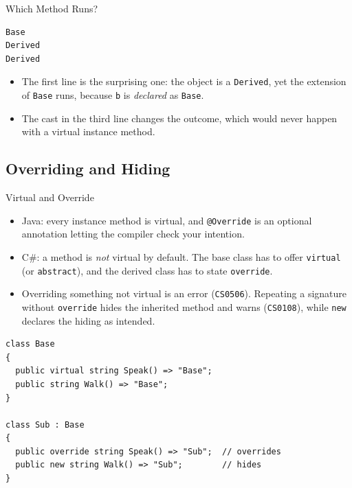 \begin{solutionframe}{Which Method Runs?}
  \begin{lstlisting}[language={},basicstyle=\scriptsize\ttfamily]
Base
Derived
Derived
  \end{lstlisting}
  \begin{itemize}
    \item The first line is the surprising one: the object is a
      \texttt{Derived}, yet the extension of \texttt{Base} runs, because
      \texttt{b} is \emph{declared} as \texttt{Base}.
    \item The cast in the third line changes the outcome, which would never
      happen with a virtual instance method.
  \end{itemize}
  \vspace{4ex}

\end{solutionframe}

\subsection{Overriding and Hiding}

\begin{frame}[fragile]{Virtual and Override}
  \begin{itemize}
    \item Java: every instance method is virtual, and \texttt{@Override} is an optional
      annotation letting the compiler check your intention.
    \item C\#: a method is \emph{not} virtual by default. The base class has to
      offer \texttt{virtual} (or \texttt{abstract}), and the derived class has to
      state \texttt{override}.
    \item Overriding something not virtual is an error (\texttt{CS0506}).
      Repeating a signature without \texttt{override} hides the inherited method
      and warns (\texttt{CS0108}), while \texttt{new} declares the hiding as
      intended.
  \end{itemize}
  \vspace{1ex}

  \begin{lstlisting}[basicstyle=\scriptsize\ttfamily]
class Base
{
  public virtual string Speak() => "Base";
  public string Walk() => "Base";
}

class Sub : Base
{
  public override string Speak() => "Sub";  // overrides
  public new string Walk() => "Sub";        // hides
}
  \end{lstlisting}
\end{frame}

